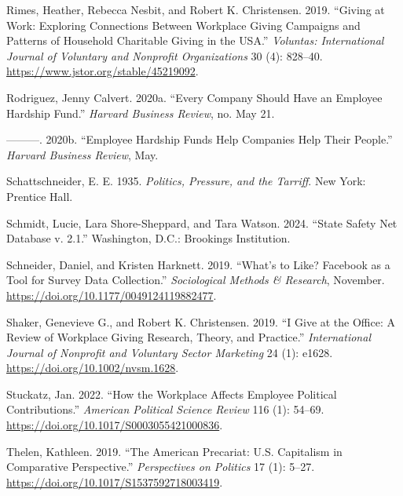 \documentclass[
  11pt,
  oneside]{article}
\newlength{\cslhangindent}
\newenvironment{CSLReferences}[2] %
 {\begin{list}{}{%
  \setlength{\itemindent}{0pt}
  \setlength{\leftmargin}{0pt}
  \setlength{\parsep}{0pt}
  \ifodd #1
   \setlength{\leftmargin}{\cslhangindent}
   \setlength{\itemindent}{-1\cslhangindent}
  \fi
  \setlength{\itemsep}{#2\baselineskip}}}
 {\end{list}}
\begin{document}
\begin{CSLReferences}{1}{0}
Rimes, Heather, Rebecca Nesbit, and Robert K. Christensen. 2019. {``Giving at {Work}: {Exploring Connections Between Workplace Giving Campaigns} and {Patterns} of {Household Charitable Giving} in the {USA}.''} \emph{Voluntas: International Journal of Voluntary and Nonprofit Organizations} 30 (4): 828--40. \url{https://www.jstor.org/stable/45219092}.

Rodriguez, Jenny Calvert. 2020a. {``Every {Company Should Have} an {Employee Hardship Fund}.''} \emph{Harvard Business Review}, no. May 21.

---------. 2020b. {``Employee {Hardship Funds Help Companies Help Their People}.''} \emph{Harvard Business Review}, May.

Schattschneider, E. E. 1935. \emph{Politics, {Pressure}, and the {Tarriff}}. New York: Prentice Hall.

Schmidt, Lucie, Lara Shore-Sheppard, and Tara Watson. 2024. {``State {Safety Net Database} v. 2.1.''} Washington, D.C.: Brookings Institution.

Schneider, Daniel, and Kristen Harknett. 2019. {``What's to {Like}? {Facebook} as a {Tool} for {Survey Data Collection}.''} \emph{Sociological Methods \& Research}, November. \url{https://doi.org/10.1177/0049124119882477}.

Shaker, Genevieve G., and Robert K. Christensen. 2019. {``I Give at the Office: {A} Review of Workplace Giving Research, Theory, and Practice.''} \emph{International Journal of Nonprofit and Voluntary Sector Marketing} 24 (1): e1628. \url{https://doi.org/10.1002/nvsm.1628}.

Stuckatz, Jan. 2022. {``How the {Workplace Affects Employee Political Contributions}.''} \emph{American Political Science Review} 116 (1): 54--69. \url{https://doi.org/10.1017/S0003055421000836}.

Thelen, Kathleen. 2019. {``The {American Precariat}: {U}.{S}. {Capitalism} in {Comparative Perspective}.''} \emph{Perspectives on Politics} 17 (1): 5--27. \url{https://doi.org/10.1017/S1537592718003419}.


\end{CSLReferences}
\end{document}
